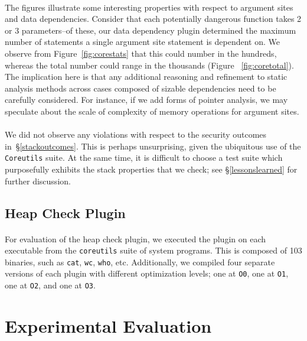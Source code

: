 \documentclass[letterpaper,11pt]{article}
\begin{document}
\paragraph{}
The figures illustrate some interesting properties with respect to argument
sites and data dependencies. Consider that each potentially dangerous function
takes 2 or 3 parameters--of these, our data dependency plugin determined the
maximum number of statements a single argument site statement is dependent on.
We observe from Figure~\ref{fig:corestats} that this could number in the hundreds,
whereas the total number could range in the thousands (Figure ~\ref{fig:coretotal}).
The implication here is that any additional reasoning and refinement to static
analysis methods across cases composed of sizable dependencies need to be
carefully considered. For instance, if we add forms of pointer analysis,
we may speculate about the scale of complexity of memory operations for
argument sites.

\paragraph{}
We did not observe any violations with respect to the security outcomes
in~\S\ref{stackoutcomes}. This is perhaps unsurprising, given the ubiquitous
use of the \texttt{Coreutils} suite. At the same time, it is difficult to
choose a test suite which purposefully exhibits the stack properties that we
check; see \S\ref{lessonslearned} for further discussion.

\subsection{Heap Check Plugin}
\paragraph{}
For evaluation of the heap check plugin, we executed the plugin on each
executable from the \texttt{coreutils} suite of system programs. This is
composed of 103 binaries, such as \texttt{cat}, \texttt{wc}, \texttt{who}, etc.
Additionally, we compiled four separate versions of each plugin with different
optimization levels; one at \texttt{O0}, one at \texttt{O1}, one at
\texttt{O2}, and one at \texttt{O3}.

\section{Experimental Evaluation}
\end{document}
